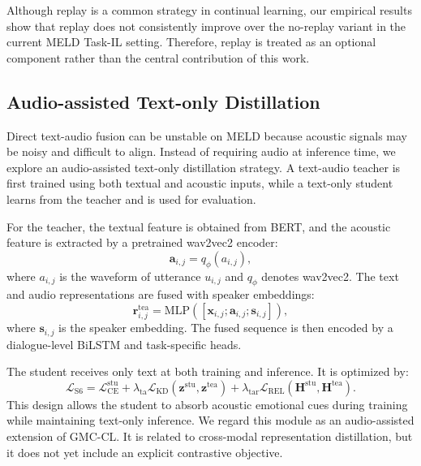 Although replay is a common strategy in continual learning, our empirical results show that replay does not consistently improve over the no-replay variant in the current MELD Task-IL setting. Therefore, replay is treated as an optional component rather than the central contribution of this work.

\subsection{Audio-assisted Text-only Distillation}
\label{subsec:audio_distillation}

Direct text-audio fusion can be unstable on MELD because acoustic signals may be noisy and difficult to align. Instead of requiring audio at inference time, we explore an audio-assisted text-only distillation strategy. A text-audio teacher is first trained using both textual and acoustic inputs, while a text-only student learns from the teacher and is used for evaluation.

For the teacher, the textual feature is obtained from BERT, and the acoustic feature is extracted by a pretrained wav2vec2 encoder:
\begin{equation}
    \mathbf{a}_{i,j} = q_{\phi}(a_{i,j}),
\end{equation}
where $a_{i,j}$ is the waveform of utterance $u_{i,j}$ and $q_{\phi}$ denotes wav2vec2. The text and audio representations are fused with speaker embeddings:
\begin{equation}
    \mathbf{r}^{\mathrm{tea}}_{i,j}
    =
    \mathrm{MLP}
    \left(
    [\mathbf{x}_{i,j}; \mathbf{a}_{i,j}; \mathbf{s}_{i,j}]
    \right),
\end{equation}
where $\mathbf{s}_{i,j}$ is the speaker embedding. The fused sequence is then encoded by a dialogue-level BiLSTM and task-specific heads.

The student receives only text at both training and inference. It is optimized by:
\begin{equation}
    \mathcal{L}_{\mathrm{S6}}
    =
    \mathcal{L}_{\mathrm{CE}}^{\mathrm{stu}}
    +
    \lambda_{\mathrm{ta}}
    \mathcal{L}_{\mathrm{KD}}
    \left(
    \mathbf{z}^{\mathrm{stu}},
    \mathbf{z}^{\mathrm{tea}}
    \right)
    +
    \lambda_{\mathrm{tar}}
    \mathcal{L}_{\mathrm{REL}}
    \left(
    \mathbf{H}^{\mathrm{stu}},
    \mathbf{H}^{\mathrm{tea}}
    \right).
\end{equation}
This design allows the student to absorb acoustic emotional cues during training while maintaining text-only inference. We regard this module as an audio-assisted extension of GMC-CL. It is related to cross-modal representation distillation, but it does not yet include an explicit contrastive objective.

